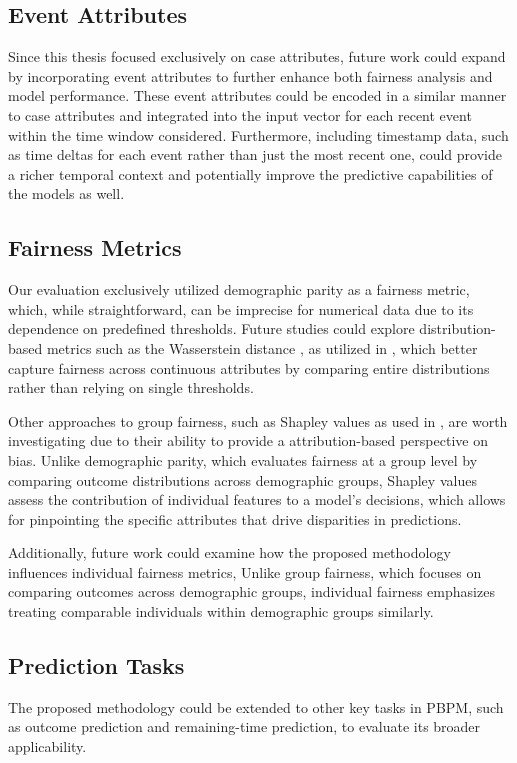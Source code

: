 \subsection{Event Attributes}
Since this thesis focused exclusively on case attributes,
future work could expand by incorporating event attributes to further enhance both fairness analysis and model performance.
These event attributes could be encoded in a similar manner to case attributes
and integrated into the input vector for each recent event within the time window considered.
Furthermore, including timestamp data, such as time deltas for each event rather than just the most recent one,
could provide a richer temporal context and potentially improve the predictive capabilities of the models as well.

\subsection{Fairness Metrics}
Our evaluation exclusively utilized demographic parity as a fairness metric, which, while straightforward,
can be imprecise for numerical data due to its dependence on predefined thresholds.
Future studies could explore distribution-based metrics such as the Wasserstein distance \cite{wasserstein},
as utilized in \cite{fairness_independence}, which better capture fairness across continuous attributes
by comparing entire distributions rather than relying on single thresholds.

Other approaches to group fairness, such as Shapley values \cite{shapley} as used in \cite{fairness_adversarial},
are worth investigating due to their ability to provide a attribution-based perspective on bias.
Unlike demographic parity, which evaluates fairness at a group level by comparing outcome distributions across demographic groups,
Shapley values assess the contribution of individual features to a model's decisions,
which allows for pinpointing the specific attributes that drive disparities in predictions.

Additionally, future work could examine how the proposed methodology influences individual fairness metrics,
Unlike group fairness, which focuses on comparing outcomes across demographic groups,
individual fairness emphasizes treating comparable individuals within demographic groups similarly.

\subsection{Prediction Tasks}
The proposed methodology could be extended to other key tasks in PBPM,
such as outcome prediction and remaining-time prediction, to evaluate its broader applicability.

